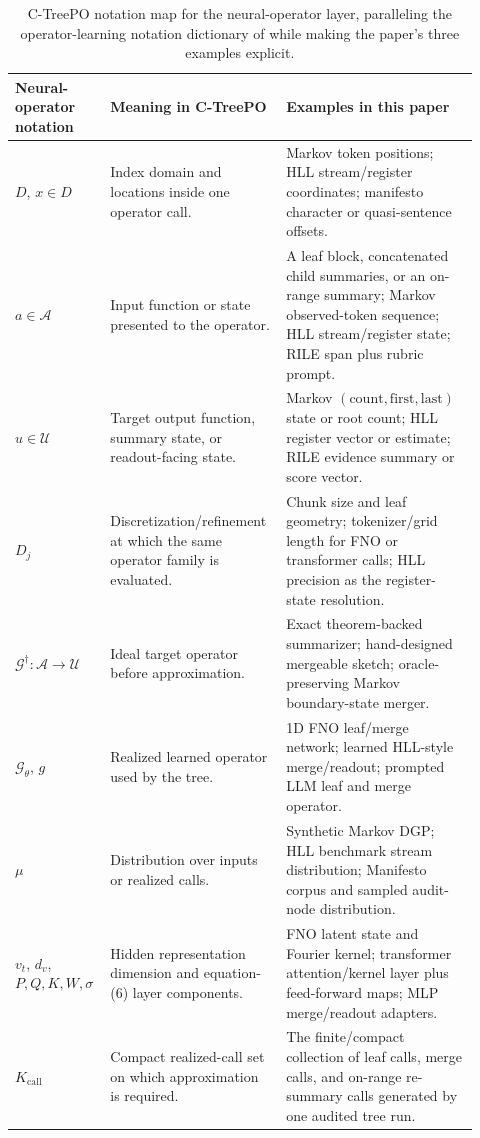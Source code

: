 \begin{table}[t]
\centering
\footnotesize
\setlength{\tabcolsep}{3pt}
\begin{tabular}{p{0.18\linewidth}p{0.34\linewidth}p{0.40\linewidth}}
\toprule
Neural-operator notation & Meaning in C-TreePO & Examples in this paper \\
\midrule
$D$, $x\in D$ &
Index domain and locations inside one operator call. &
Markov token positions; HLL stream/register coordinates; manifesto character or quasi-sentence offsets. \\
$a\in\mathcal{A}$ &
Input function or state presented to the operator. &
A leaf block, concatenated child summaries, or an on-range summary; Markov observed-token sequence; HLL stream/register state; RILE span plus rubric prompt. \\
$u\in\mathcal{U}$ &
Target output function, summary state, or readout-facing state. &
Markov $(\text{count},\text{first},\text{last})$ state or root count; HLL register vector or estimate; RILE evidence summary or score vector. \\
$D_j$ &
Discretization/refinement at which the same operator family is evaluated. &
Chunk size and leaf geometry; tokenizer/grid length for FNO or transformer calls; HLL precision as the register-state resolution. \\
$\mathcal{G}^{\dagger}:\mathcal{A}\to\mathcal{U}$ &
Ideal target operator before approximation. &
Exact theorem-backed summarizer; hand-designed mergeable sketch; oracle-preserving Markov boundary-state merger. \\
$\mathcal{G}_{\theta}$, $g$ &
Realized learned operator used by the tree. &
1D FNO leaf/merge network; learned HLL-style merge/readout; prompted LLM leaf and merge operator. \\
$\mu$ &
Distribution over inputs or realized calls. &
Synthetic Markov DGP; HLL benchmark stream distribution; Manifesto corpus and sampled audit-node distribution. \\
$v_t$, $d_v$, $P,Q,K,W,\sigma$ &
Hidden representation dimension and equation-(6) layer components. &
FNO latent state and Fourier kernel; transformer attention/kernel layer plus feed-forward maps; MLP merge/readout adapters. \\
$K_{\mathrm{call}}$ &
Compact realized-call set on which approximation is required. &
The finite/compact collection of leaf calls, merge calls, and on-range re-summary calls generated by one audited tree run. \\
\bottomrule
\end{tabular}
\caption{C-TreePO notation map for the neural-operator layer, paralleling the operator-learning notation dictionary of \citet[Table~10]{Kovachki23NeuralOperator} while making the paper's three examples explicit.}
\label{tab:ctreepo-neural-operator-notation}
\end{table}

